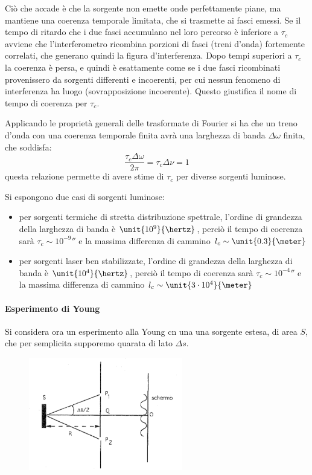 Ciò che accade è che la sorgente non emette onde perfettamente piane, ma mantiene una coerenza temporale limitata, che si trasmette ai fasci emessi. Se il tempo di ritardo che i due fasci accumulano nel loro percorso è inferiore a $ \tau_c $ avviene che l'interferometro ricombina porzioni di fasci (treni d'onda) fortemente correlati, che generano quindi la figura d'interferenza. Dopo tempi superiori a $ \tau_c $ la coerenza è persa, e quindi è esattamente come se i due fasci ricombinati provenissero da sorgenti differenti e incoerenti, per cui nessun fenomeno di interferenza ha luogo (sovrapposizione incoerente).
Questo giustifica il nome di tempo di coerenza per $ \tau_c $.

Applicando le proprietà generali delle trasformate di Fourier si ha che un treno d'onda con una coerenza temporale finita avrà una larghezza di banda $\Delta \omega$ finita, che soddisfa:
\[ \frac{\tau_c \Delta \omega}{2\pi} = \tau_c \Delta \nu = 1 \]
questa relazione permette di avere stime di $ \tau_c $ per diverse sorgenti luminose.

\begin{es}
	Si espongono due casi di sorgenti luminose:
	\begin{itemize}
		\item per sorgenti termiche di stretta distribuzione spettrale, l'ordine di grandezza della larghezza di banda è $ \unit{10^9}{\hertz} $, perciò il tempo di coerenza sarà $ \tau_c \sim \unit{10^{-9}}{\second} $ e la massima differenza di cammino $ l_c \sim \unit{0.3}{\meter} $
		\item per sorgenti laser ben stabilizzate, l'ordine di grandezza della larghezza di banda è $ \unit{10^4}{\hertz} $, perciò il tempo di coerenza sarà $ \tau_c \sim \unit{10^{-4}}{\second} $ e la massima differenza di cammino $ l_c \sim \unit{3\cdot10^4}{\meter} $
	\end{itemize}
\end{es}

\paragraph{Esperimento di Young} Si considera ora un esperimento alla Young cn una una sorgente estesa, di area $ S $, che per semplicita supporemo quarata di lato $ \Delta s $.

\begin{figure}[t]
	\centering
	\includegraphics[width=0.6\textwidth]{Immagini/Young.png}
	\vspace{-10pt}
	\caption{}
	\label{fig:young}
	\vspace{-10pt}
\end{figure}

